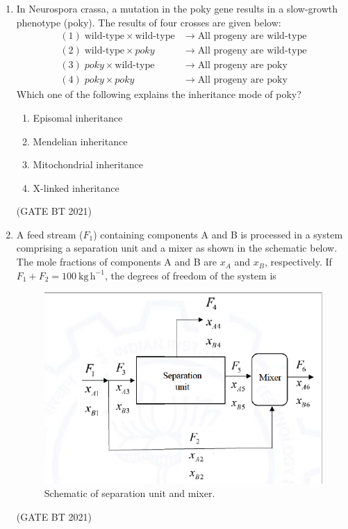 \documentclass[journal,12pt,onecolumn]{IEEEtran}
\theoremstyle{remark}
\begin{document}
\begin{enumerate}
\item In Neurospora crassa, a mutation in the poky gene results in a slow-growth phenotype (poky). The results of four crosses are given below:
\[
\begin{aligned}
(1)\; \text{wild-type} \times \text{wild-type} &\;\rightarrow\; \text{All progeny are wild-type} \\
(2)\; \text{wild-type} \times poky &\;\rightarrow\; \text{All progeny are wild-type} \\
(3)\; poky \times \text{wild-type} &\;\rightarrow\; \text{All progeny are poky} \\
(4)\; poky \times poky &\;\rightarrow\; \text{All progeny are poky}
\end{aligned}
\]
Which one of the following explains the inheritance mode of poky?
\begin{enumerate}
    \item Episomal inheritance
    \item Mendelian inheritance
    \item Mitochondrial inheritance
    \item X-linked inheritance
\end{enumerate}
\hfill (GATE BT 2021)

\item A feed stream ($F_1$) containing components A and B is processed in a system comprising a separation unit and a mixer as shown in the schematic below. The mole fractions of components A and B are $x_A$ and $x_B$, respectively. If $F_1 + F_2 = 100\ \mathrm{kg\,h^{-1}}$, the degrees of freedom of the system is
\begin{figure}
    \centering
    \includegraphics[width=\columnwidth]{figs/unit.png}
    \caption{Schematic of separation unit and mixer.}
\end{figure}
\hfill (GATE BT 2021)



\end{enumerate}
\end{document}
